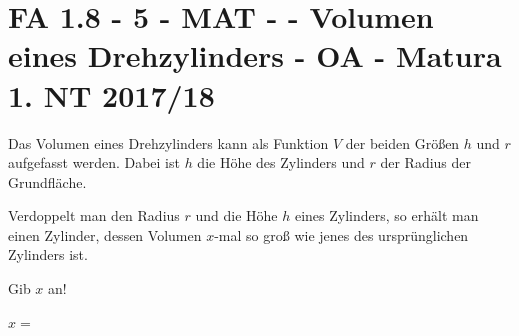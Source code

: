 \section{FA 1.8 - 5 - MAT - - Volumen eines Drehzylinders - OA - Matura 1. NT 2017/18}

\begin{beispiel}[FA 1.8]{1}
Das Volumen eines Drehzylinders kann als Funktion $V$ der beiden Größen $h$ und $r$ aufgefasst werden. Dabei ist $h$ die Höhe des Zylinders und $r$ der Radius der Grundfläche.

Verdoppelt man den Radius $r$ und die Höhe $h$ eines Zylinders, so erhält man einen Zylinder, dessen Volumen $x$-mal so groß wie jenes des ursprünglichen Zylinders ist.

Gib $x$ an!\leer

$x=$\,
\end{beispiel}